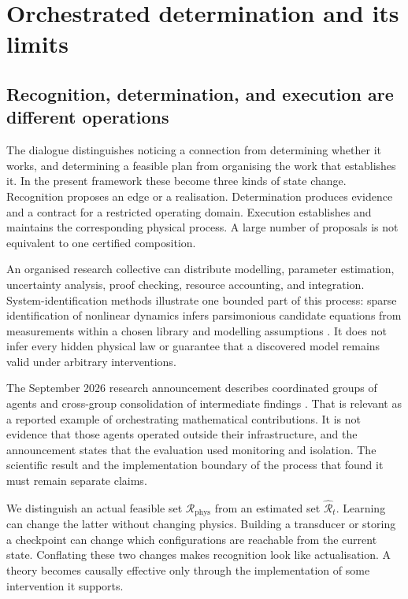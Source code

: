 \documentclass[11pt,a4paper]{article}
\theoremstyle{definition}
\theoremstyle{remark}
\begin{document}
\section{Orchestrated determination and its limits}\label{sec:discovery}
\subsection{Recognition, determination, and execution are different operations}
The dialogue distinguishes noticing a connection from determining whether it works, and determining a feasible plan from organising the work that establishes it. In the present framework these become three kinds of state change. Recognition proposes an edge or a realisation. Determination produces evidence and a contract for a restricted operating domain. Execution establishes and maintains the corresponding physical process. A large number of proposals is not equivalent to one certified composition.

An organised research collective can distribute modelling, parameter estimation, uncertainty analysis, proof checking, resource accounting, and integration. System-identification methods illustrate one bounded part of this process: sparse identification of nonlinear dynamics infers parsimonious candidate equations from measurements within a chosen library and modelling assumptions \citep{sindy}. It does not infer every hidden physical law or guarantee that a discovered model remains valid under arbitrary interventions.

The September 2026 research announcement describes coordinated groups of agents and cross-group consolidation of intermediate findings \citep{openaiannounce}. That is relevant as a reported example of orchestrating mathematical contributions. It is not evidence that those agents operated outside their infrastructure, and the announcement states that the evaluation used monitoring and isolation. The scientific result and the implementation boundary of the process that found it must remain separate claims.

We distinguish an actual feasible set $\mathscr R_{\mathrm{phys}}$ from an estimated set $\widehat{\mathscr R}_t$. Learning can change the latter without changing physics. Building a transducer or storing a checkpoint can change which configurations are reachable from the current state. Conflating these two changes makes recognition look like actualisation. A theory becomes causally effective only through the implementation of some intervention it supports.
\end{document}
